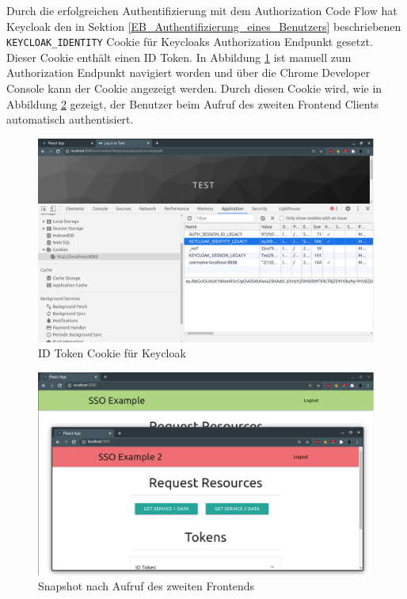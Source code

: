 Durch die erfolgreichen Authentifizierung mit dem Authorization Code Flow hat Keycloak den in Sektion \ref{EB_Authentifizierung_eines_Benutzers} beschriebenen \texttt{KEYCLOAK\_IDENTITY} Cookie für Keycloaks Authorization Endpunkt gesetzt. Dieser Cookie enthält einen ID Token. In Abbildung \ref{fig:EB_ID Token Cookie für Keycloak} ist manuell zum Authorization Endpunkt navigiert worden und über die Chrome Developer Console kann der Cookie angezeigt werden. Durch diesen Cookie wird, wie in Abbildung \ref{fig:EB_Snapshot nach Aufruf des zweiten Frontends} gezeigt, der Benutzer beim Aufruf des zweiten Frontend Clients automatisch authentisiert.

\begin{figure}[!ht]
	\centering
	\includegraphics[width=1\textwidth]{Images/EbertScherer/FrontendCookieForKeycloak.PNG}
	\caption{ID Token Cookie für Keycloak}
	\label{fig:EB_ID Token Cookie für Keycloak}
\end{figure}

\begin{figure}[!ht]
	\centering
	\includegraphics[width=1\textwidth]{Images/EbertScherer/FrontendOpenSecondFrontend.PNG}
	\caption{Snapshot nach Aufruf des zweiten Frontends}
	\label{fig:EB_Snapshot nach Aufruf des zweiten Frontends}
\end{figure}


